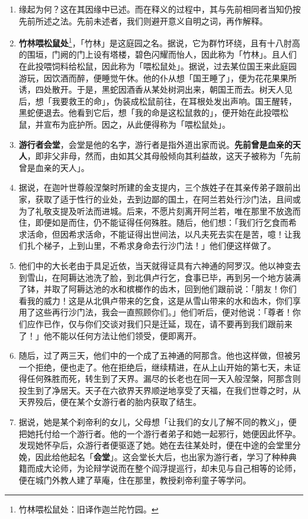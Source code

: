 \begin{enumerate}\item 缘起为何？这在其因缘中已述。而在释义的过程中，其与先前相同者当知仍按先前所述之法。先前未述者，我们则避开意义自明之词，再作解释。
\item \textbf{竹林喂松鼠处}\footnote{竹林喂松鼠处：旧译作迦兰陀竹园。}，「竹林」是这庭园之名。据说，它为群竹环绕，且有十八肘高的围垣，门阙的门上设有塔楼，碧色闪耀而怡人，因此称为「竹林」。且人们在此投喂饲料给松鼠，因此称为「喂松鼠处」。据说，过去某位国王来此庭园游玩，因饮酒而醉，便睡觉午休。他的仆从想「国王睡了」，便为花花果果所诱，四处散开。于是，黑蛇因酒香从某处树洞出来，朝国王而去。树天人见后，想「我要救王的命」，伪装成松鼠前往，在耳根处发出声响。国王醒转，黑蛇便退去。他看到它后，想「我的命是这松鼠救的」，便开始在此投喂松鼠，并宣布为庇护所。因之，从此便得称为「喂松鼠处」。
\item \textbf{游行者会堂}，会堂是他的名字，游行者是指外道出家而说。\textbf{先前曾是血亲的天人}，即非父非母，然而，由如其父其母般倾向其利益故，这天子被称为「先前曾是血亲的天人」。
\item 据说，在迦叶世尊般涅槃时所建的金支提内，三个族姓子在其亲传弟子跟前出家，获取了适于性行的业处，去到边鄙的国土，在阿兰若处行沙门法，且间或为了礼敬支提及听法而进城。后来，不愿片刻离开阿兰若，唯在那里不放逸而住，即便如是而住，仍不能证得任何殊胜。随后，他们想：「我们行乞食而希求活命，但因希求活命，不能证得出世间法，以凡夫死去实在是苦，噫！让我们扎个梯子，上到山里，不希求身命去行沙门法！」他们便这样做了。
\item 他们中的大长老由于具足近依，当天就得证具有六神通的阿罗汉。他以神变去到雪山，在阿耨达池洗了脸，到北俱卢行乞，食事已毕，再到另一个地方装满了钵，并取了阿耨达池的水和槟榔作的齿木，回到他们跟前说：「朋友！你们看我的威力！这是从北俱卢带来的乞食，这是从雪山带来的水和齿木，你们享用了这些再行沙门法，我会一直照顾你们。」他们听后，便对他说：「尊者！你们应作已作，仅与你们交谈对我们只是迁延，现在，请不要再到我们跟前来了！」他不能以任何方法让他们领受，便即离开。
\item 随后，过了两三天，他们中的一个成了五神通的阿那含。他也这样做，但被另一个拒绝，便也走了。他在拒绝后，继续精进，在从上山开始的第七天，未证得任何殊胜而死，转生到了天界。漏尽的长老也在同一天入般涅槃，阿那含则投生到了净居天。天子在六欲界天界顺逆地享受了天福，在我们世尊之时，从天界殁后，便在某个女游行者的胎内获取了结生。
\item 据说，她是某个刹帝利的女儿，父母想「让我们的女儿了解不同的教义」，便把她托付给一个游行者。他的一个游行者弟子和她一起邪行，她便因此怀孕。发现她怀孕后，众游行者便驱逐了她。她在去往某处时，便在中途的会堂里分娩，因此给他起名「\textbf{会堂}」。这会堂长大后，也出家为游行者，学习了种种典籍而成大论师，为论辩学说而在整个阎浮提巡行，却未见与自己相等的论师，便在城门外教人建了草庵，住在那里，教授刹帝利童子等学问。

\end{enumerate}
